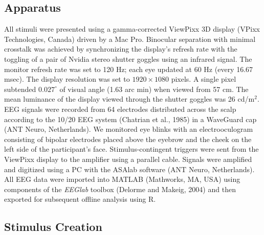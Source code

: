 \documentclass[review,
  12pt,
]{elsarticle}
\begin{document}
\subsection{Apparatus}\label{apparatus}

All stimuli were presented using a gamma-corrected ViewPixx 3D display
(VPixx Technologies, Canada) driven by a Mac Pro. Binocular separation
with minimal crosstalk was achieved by synchronizing the display's
refresh rate with the toggling of a pair of Nvidia stereo shutter
goggles using an infrared signal. The monitor refresh rate was set to
120 Hz; each eye updated at 60 Hz (every 16.67 msec). The display
resolution was set to \(1920 \times 1080\) pixels. A single pixel
subtended \(0.027^\circ\) of visual angle (1.63 arc min) when viewed
from 57 cm. The mean luminance of the display viewed through the shutter
goggles was 26 cd/m\(^2\). EEG signals were recorded from 64 electrodes
distributed across the scalp according to the 10/20 EEG system (Chatrian
et al., 1985) in a WaveGuard cap (ANT Neuro, Netherlands). We monitored
eye blinks with an electrooculogram consisting of bipolar electrodes
placed above the eyebrow and the cheek on the left side of the
participant's face. Stimulus-contingent triggers were sent from the
ViewPixx display to the amplifier using a parallel cable. Signals were
amplified and digitized using a PC with the ASAlab software (ANT Neuro,
Netherlands). All EEG data were imported into MATLAB (Mathworks, MA,
USA) using components of the \textit{EEGlab} toolbox (Delorme and
Makeig, 2004) and then exported for subsequent offline analysis using R.

\subsection{Stimulus Creation}\label{stimulus-creation}
\end{document}
